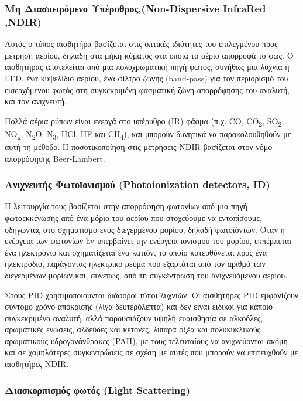 \subsubsection{Μη Διασπειρόμενο Υπέρυθρος,(Non-Dispersive InfraRed ,NDIR)}

Αυτός ο τύπος αισθητήρα βασίζεται στις οπτικές ιδιότητες του επιλεγμένου προς μέτρηση αερίου,
δηλαδή στα μήκη κύματος στα οποία το αέριο απορροφά το φως. 
Ο αισθητήρας αποτελείται από μια πολυχρωματική πηγή φωτός, 
συνήθως μια λυχνία ή LED, ένα κυψελίδιο αερίου, ένα φίλτρο ζώνης (band-pass) για τον περιορισμό του εισερχόμενου φωτός στη συγκεκριμένη φασματική ζώνη απορρόφησης του αναλυτή, και τον ανιχνευτή.

Πολλά αέρια ρύπων είναι ενεργά στο υπέρυθρο (IR) φάσμα (π.χ. CO, CO\textsubscript{2}, SO\textsubscript{2}, NO\textsubscript{x}, N\textsubscript{2}O, N\textsubscript{3}, HCl, HF και CH\textsubscript{4}),
και μπορούν δυνητικά να παρακολουθηθούν με αυτή τη μέθοδο. 
Η ποσοτικοποίηση στις μετρήσεις NDIR βασίζεται στον νόμο απορρόφησης Beer-Lambert.

\subsubsection{Ανιχνευτής Φωτοϊονισμού (Photoionization detectors, ID)}

Η λειτουργία τους βασίζεται στην απορρόφηση φωτονίων από μια πηγή φωτοεκκένωσης από ένα μόριο του αερίου που στοχεύουμε να εντοπίσουμε, 
οδηγώντας στο σχηματισμό ενός διεγερμένου μορίου, δηλαδή φωτοϊόντων.
Όταν η ενέργεια των φωτονίων hv υπερβαίνει την ενέργεια ιονισμού του μορίου, εκπέμπεται ένα ηλεκτρόνιο και σχηματίζεται ένα κατιόν, το οποίο κατευθύνεται προς ένα ηλεκτρόδιο, παράγοντας ηλεκτρικό ρεύμα που εξαρτάται από τον αριθμό των διεγερμένων μορίων και, συνεπώς, από τη συγκέντρωση του ανιχνευόμενου αερίου.

Στους PID χρησιμοποιούνται διάφοροι τύποι λυχνιών.
Οι αισθητήρες PID εμφανίζουν σύντομο χρόνο απόκρισης (λίγα δευτερόλεπτα) και δεν είναι ειδικοί για κάποιο συγκεκριμένο αναλυτή,
αλλά παρουσιάζουν υψηλή ευαισθησία σε αλκοόλες, αρωματικές ενώσεις, αλδεΰδες και κετόνες, λιπαρά οξέα και πολυκυκλικούς αρωματικούς υδρογονάνθρακες (PAH), με τους τελευταίους να ανιχνεύονται ακόμη και σε χαμηλότερες συγκεντρώσεις σε σχέση με αυτές που μπορούν να επιτευχθούν με αισθητήρες NDIR.



\subsubsection{Διασκορπισμός φωτός (Light Scattering)}

